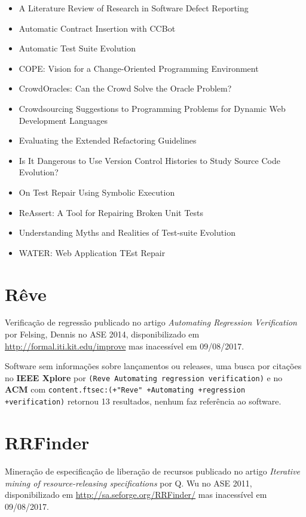 \begin{itemize}
\item A Literature Review of Research in Software Defect Reporting
\item Automatic Contract Insertion with CCBot
\item Automatic Test Suite Evolution
\item COPE: Vision for a Change-Oriented Programming Environment
\item CrowdOracles: Can the Crowd Solve the Oracle Problem?
\item Crowdsourcing Suggestions to Programming Problems for Dynamic Web Development Languages
\item Evaluating the Extended Refactoring Guidelines
\item Is It Dangerous to Use Version Control Histories to Study Source Code Evolution?
\item On Test Repair Using Symbolic Execution
\item ReAssert: A Tool for Repairing Broken Unit Tests
\item Understanding Myths and Realities of Test-suite Evolution
\item WATER: Web Application TEst Repair
\end{itemize}


\section{Rêve}

Verificação de regressão
publicado no artigo {\it Automating Regression Verification}
por Felsing, Dennis
no ASE 2014,
disponibilizado em \url{http://formal.iti.kit.edu/improve}
mas inacessível em 09/08/2017.

Software sem informações sobre lançamentos ou releases,
uma busca por citações no {\bf IEEE Xplore} por
\texttt{(Reve Automating regression verification)}
e no {\bf ACM} com
\texttt{content.ftsec:(+"Reve" +Automating +regression +verification)}
retornou
13 resultados,
nenhum faz referência ao software.



\section{RRFinder}

Mineração de especificação de liberação de recursos
publicado no artigo {\it Iterative mining of resource-releasing specifications}
por Q. Wu
no ASE 2011,
disponibilizado em \url{http://sa.seforge.org/RRFinder/}
mas inacessível em 09/08/2017.


